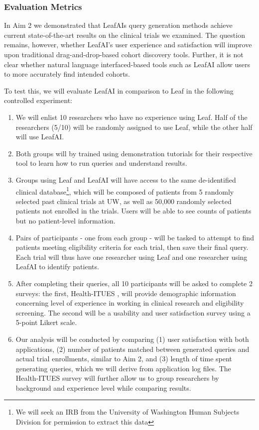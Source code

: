 \documentclass[../main.tex]{subfiles}
\begin{document}
\subsubsection{Evaluation Metrics}

In Aim 2 we demonstrated that LeafAIs query generation methods achieve current state-of-the-art results on the clinical trials we examined. The question remains, however, whether LeafAI's user experience and satisfaction will improve upon traditional drag-and-drop-based cohort discovery tools. Further, it is not clear whether natural language interfaced-based tools such as LeafAI allow users to more accurately find intended cohorts.

To test this, we will evaluate LeafAI in comparison to Leaf in the following controlled experiment: 

\begin{enumerate}
    \item We will enlist 10 researchers who have no experience using Leaf. Half of the researchers (5/10) will be randomly assigned to use Leaf, while the other half will use LeafAI.
    \item Both groups will by trained using demonstration tutorials for their respective tool to learn how to run queries and understand results.
    \item Groups using Leaf and LeafAI will have access to the same de-identified clinical database\footnote{We will seek an IRB from the University of Washington Human Subjects Division for permission to extract this data}, which will be composed of patients from 5 randomly selected past clinical trials at UW, as well as 50,000 randomly selected patients not enrolled in the trials. Users will be able to see counts of patients but no patient-level information.
    \item Pairs of participants - one from each group - will be tasked to attempt to find patients meeting eligibility criteria for each trial, then save their final query. Each trial will thus have one researcher using Leaf and one researcher using LeafAI to identify patients.
    \item After completing their queries, all 10 participants will be asked to complete 2 surveys: the first, Health-ITUES \cite{yen2010development}, will provide demographic information concerning level of experience in working in clinical research and eligibility screening. The second will be a usability and user satisfaction survey using a 5-point Likert scale.
    \item Our analysis will be conducted by comparing (1) user satisfaction with both applications, (2) number of patients matched between generated queries and actual trial enrollments, similar to Aim 2, and (3) length of time spent generating queries, which we will derive from application log files. The Health-ITUES survey will further allow us to group researchers by background and experience level while comparing results.
\end{enumerate}
\end{document}
